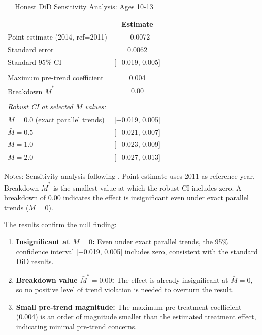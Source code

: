 \documentclass[12pt]{article}
\begin{document}
\begin{table}[H]
\centering
\caption{Honest DiD Sensitivity Analysis: Ages 10-13}
\label{tab:honest_did}
\begin{threeparttable}
\begin{tabular}{lc}
\toprule
& Estimate \\
\midrule
Point estimate (2014, ref=2011) & $-$0.0072 \\
Standard error & 0.0062 \\
Standard 95\% CI & [$-$0.019, 0.005] \\
\\
Maximum pre-trend coefficient & 0.004 \\
Breakdown $\bar{M}^*$ & 0.00 \\
\\
\midrule
\multicolumn{2}{l}{\textit{Robust CI at selected $\bar{M}$ values:}} \\
\quad $\bar{M} = 0.0$ (exact parallel trends) & [$-$0.019, 0.005] \\
\quad $\bar{M} = 0.5$ & [$-$0.021, 0.007] \\
\quad $\bar{M} = 1.0$ & [$-$0.023, 0.009] \\
\quad $\bar{M} = 2.0$ & [$-$0.027, 0.013] \\
\bottomrule
\end{tabular}
\begin{tablenotes}
\footnotesize
\item Notes: Sensitivity analysis following \citet{RambachanRoth2023}. Point estimate uses 2011 as reference year. Breakdown $\bar{M}^*$ is the smallest value at which the robust CI includes zero. A breakdown of 0.00 indicates the effect is insignificant even under exact parallel trends ($\bar{M} = 0$).
\end{tablenotes}
\end{threeparttable}
\end{table}

The results confirm the null finding:

\begin{enumerate}
\item \textbf{Insignificant at $\bar{M} = 0$:} Even under exact parallel trends, the 95\% confidence interval [$-$0.019, 0.005] includes zero, consistent with the standard DiD results.

\item \textbf{Breakdown value $\bar{M}^* = 0.00$:} The effect is already insignificant at $\bar{M} = 0$, so no positive level of trend violation is needed to overturn the result.

\item \textbf{Small pre-trend magnitude:} The maximum pre-treatment coefficient (0.004) is an order of magnitude smaller than the estimated treatment effect, indicating minimal pre-trend concerns.
\end{enumerate}
\end{document}
